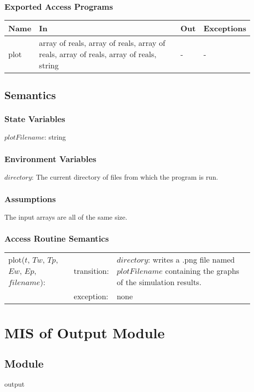 \documentclass[12pt]{article}
\begin{document}
\subsubsection{Exported Access Programs}
\begin{center}
\begin{tabular}{p{2cm} p{8cm} p{2cm} p{2cm}}
\hline
\textbf{Name} & \textbf{In} & \textbf{Out} & \textbf{Exceptions} \\
\hline
plot & array of reals, array of reals, array of reals, array of reals, array of reals, string & - & - \\
\hline
\end{tabular}
\end{center}
\subsection{Semantics}
\subsubsection{State Variables}
$plotFilename$: string
\subsubsection{Environment Variables}
$directory$: The current directory of files from which the program is run.
\subsubsection{Assumptions}
The input arrays are all of the same size.
\subsubsection{Access Routine Semantics}
\begin{center}
\begin{tabular}{l l p{6cm}}
plot($t$, $Tw$, $Tp$, $Ew$, $Ep$, $filename$): & transition: & $directory$: writes a .png file named $plotFilename$ containing the graphs of the simulation results. \\
& exception: & none \\
\end{tabular}
\end{center}

\section{MIS of Output Module} \label{Output}
\subsection{Module}
output
\end{document}
